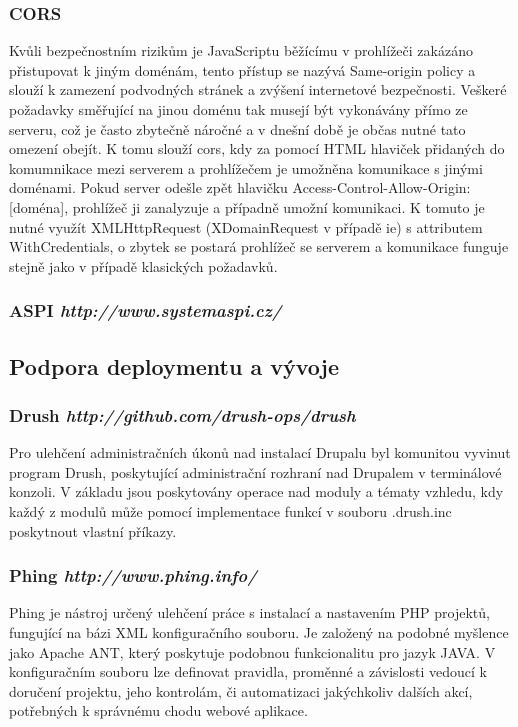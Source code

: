 \subsubsection*{CORS} 
Kvůli bezpečnostním rizikům je JavaScriptu běžícímu v prohlížeči zakázáno přistupovat k jiným doménám, tento přístup se nazývá Same-origin policy a slouží k zamezení podvodných stránek a zvýšení internetové bezpečnosti. Veškeré požadavky směřující na jinou doménu tak musejí být vykonávány přímo ze serveru, což je často zbytečně náročné a v dnešní době je občas nutné tato omezení obejít. K tomu slouží \gls{cors}, kdy za pomocí HTML hlaviček přidaných do komumnikace mezi serverem a prohlížečem je umožněna komunikace s jinými doménami. Pokud server odešle zpět hlavičku Access-Control-Allow-Origin: [doména], prohlížeč ji zanalyzuje a případně umožní komunikaci. K tomuto je nutné využít XMLHttpRequest (XDomainRequest v případě \gls{ie}) s attributem WithCredentials, o zbytek se postará prohlížeč se serverem a komunikace funguje stejně jako v případě klasických požadavků.

\subsubsection*{ASPI \hfill \emph{http://www.systemaspi.cz/}}

\subsection{Podpora deploymentu a vývoje}

\subsubsection*{Drush \hfill \emph{http://github.com/drush-ops/drush}}
\label{subsec:drush}
Pro ulehčení administračních úkonů nad instalací Drupalu byl komunitou vyvinut program Drush, poskytující administrační rozhraní nad Drupalem v terminálové konzoli. V základu jsou poskytovány operace nad moduly a tématy vzhledu, kdy každý z modulů může pomocí implementace funkcí v souboru .drush.inc poskytnout vlastní příkazy.

\subsubsection*{Phing \hfill \emph{http://www.phing.info/}}
\label{subsec:phing}
Phing je nástroj určený ulehčení práce s instalací a nastavením PHP projektů, fungující na bázi XML konfiguračního souboru. Je založený na podobné myšlence jako Apache ANT, který poskytuje podobnou funkcionalitu pro jazyk JAVA. V konfiguračním souboru lze definovat pravidla, proměnné a závislosti vedoucí k doručení projektu, jeho kontrolám, či automatizaci jakýchkoliv dalších akcí, potřebných k správnému chodu webové aplikace. 

